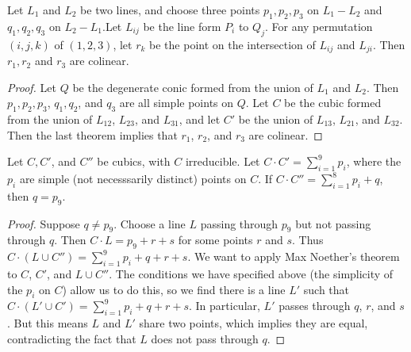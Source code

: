 \begin{corollary}
    Let $L_1$ and $L_2$ be two lines, and choose three points $p_1,p_2,p_3$ on $L_1 - L_2$ and $q_1,q_2,q_3$ on $L_2 - L_1$.Let $L_{ij}$ be the line form $P_i$ to $Q_j$. For any permutation $(i,j,k)$ of $(1,2,3)$, let $r_k$ be the point on the intersection of $L_{ij}$ and $L_{ji}$. Then $r_1,r_2$ and $r_3$ are colinear.
\end{corollary}
\begin{proof}
    Let $Q$ be the degenerate conic formed from the union of $L_1$ and $L_2$. Then $p_1,p_2,p_3$, $q_1,q_2$, and $q_3$ are all simple points on $Q$. Let $C$ be the cubic formed from the union of $L_{12}$, $L_{23}$, and $L_{31}$, and let $C'$ be the union of $L_{13}$, $L_{21}$, and $L_{32}$. Then the last theorem implies that $r_1$, $r_2$, and $r_3$ are colinear.
\end{proof}

\begin{theorem}
    Let $C,C'$, and $C''$ be cubics, with $C$ irreducible. Let $C \cdot C' = \sum_{i = 1}^9 p_i$, where the $p_i$ are simple (not necesssarily distinct) points on $C$. If $C \cdot C'' = \sum_{i = 1}^8 p_i + q$, then $q = p_9$.
\end{theorem}
\begin{proof}
    Suppose $q \neq p_9$. Choose a line $L$ passing through $p_9$ but not passing through $q$. Then $C \cdot L = p_9 + r + s$ for some points $r$ and $s$. Thus $C \cdot (L \cup C'') = \sum_{i = 1}^9 p_i + q + r + s$. We want to apply Max Noether's theorem to $C$, $C'$, and $L \cup C''$. The conditions we have specified above (the simplicity of the $p_i$ on $C$) allow us to do this, so we find there is a line $L'$ such that $C \cdot (L' \cup C') = \sum_{i = 1}^9 p_i + q + r + s$. In particular, $L'$ passes through $q$, $r$, and $s$. But this means $L$ and $L'$ share two points, which implies they are equal, contradicting the fact that $L$ does not pass through $q$.
\end{proof}

